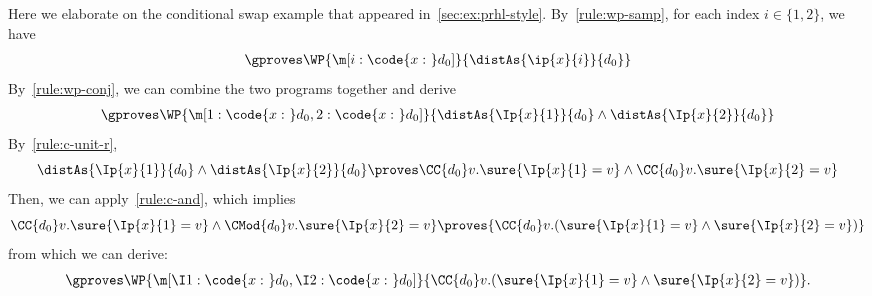 \documentclass[acmsmall,nonacm,screen,appendix]{acmart}
\begin{document}
Here we elaborate on the conditional swap example that appeared in~\cref{sec:ex:prhl-style}.
By~\cref{rule:wp-samp}, for each index $i \in \{1, 2\}$, we have
\begin{align*}
  \gproves \WP{\m[i: \code{x:~}d_0]}{\distAs{\ip{x}{i}}{d_0}}
\end{align*}
By~\cref{rule:wp-conj}, we can combine the two programs together and derive
\begin{align*}
  \gproves \WP{\m[1: \code{x:~}d_0, 2: \code{x:~}d_0]}{\distAs{\Ip{x}{1}}{d_0} \land \distAs{\Ip{x}{2}}{d_0}}
\end{align*}
By~\cref{rule:c-unit-r},
\[\distAs{\Ip{x}{1}}{d_0} \land \distAs{\Ip{x}{2}}{d_0} \proves
  \CC{d_0} v. \sure{\Ip{x}{1} = v} \land  \CC{d_0} v. \sure{\Ip{x}{2} = v}
\]
Then, we can apply~\cref{rule:c-and}, which implies
\[
  \CC{d_0} v. \sure{\Ip{x}{1} = v} \land  \CMod{d_0} v. \sure{\Ip{x}{2} = v}
  \proves
  {\CC{d_0} v. (\sure{\Ip{x}{1} = v} \land  \sure{\Ip{x}{2} = v})}
\]
from which we can derive:
\begin{align*}
  \gproves \WP{\m[\I1: \code{x:~}d_0, \I2: \code{x:~}d_0]}{\CC{d_0} v.(\sure{\Ip{x}{1}=v} \land \sure{\Ip{x}{2}=v})}.
\end{align*}
\end{document}
